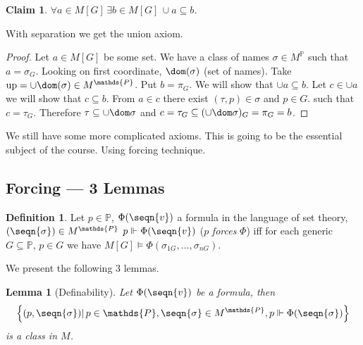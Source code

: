 \documentclass[11pt,pdftex,twoside,a4paper]{article}
\newcommand{\dsP}{\ensuremath{\mathds{P}}}
\newcommand{\up}{\ensuremath{\mathop{\rm up}\nolimits}}
\newtheorem{lemma}[thm]{Lemma}
\newtheorem{claim}[thm]{Claim}
\theoremstyle{definition}
\newtheorem{ldef}[thm]{Definition}
\begin{document}
\begin{claim}
\(\forall a\in M[G]\, \exists b\in M[G]\, \cup a \subseteq b\).
\end{claim}
With separation we get the union axiom.
\begin{proof}
Let \(a\in M[G]\) be some set. We have a class of names \(\sigma\in M^\dsP\)
such that \(a = \sigma_G\).
Looking on first coordinate, \(\dom(\sigma)\) (set of names).
Take \(\up = \cup \dom(\sigma) \in M^\dsP\).
Put \(b=\pi_G\). We will show that \(\cup a \subseteq b\).
Let \(c\in \cup a\) we will show that \(c\subseteq b\).
From \(a\in c\) there exist \((\tau,p)\in \sigma\) and \(p\in G\).
such that \(c = \tau_G\). Therefore \(\tau \subseteq \cup \dom \sigma\)
and \(c = \tau_G \subseteq (\cup\dom\sigma)_G = \pi_G = b\).
\end{proof}

We still have some more complicated axioms.
This is going to be the essential subject of the course.
Using forcing technique.

\subsection{Forcing --- 3 Lemmas}

\begin{ldef}
Let \(p\in\dsP\), \(\Phi(\seqn{v})\) a formula in the language of set theory,
\((\seqn{\sigma})\in M^\dsP\)
\(p \Vdash \Phi(\seqn{v})\) ($p$ \emph{forces} \(\Phi\)) iff
for each generic \(G\subseteq \dsP\), \(p\in G\)
we have \(M[G] \models \Phi(\sigma_{1G},\ldots,\sigma_{nG})\).
\end{ldef}

We present the following 3 lemmas.

\begin{lemma}[Definability]
Let \(\Phi(\seqn{v})\) be a formula, then
\begin{equation*}
\left\{(p,\seqn{\sigma})|\, p\in \dsP, \seqn{\sigma}\in M^\dsP,
  p\Vdash \Phi(\seqn{\sigma})\right\}
\end{equation*}
is a class in $M$.
\end{lemma}
\end{document}
